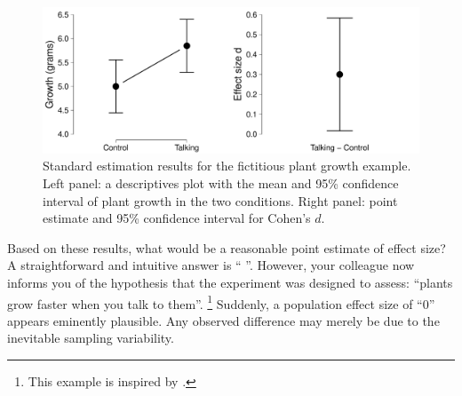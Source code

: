 \documentclass[a4paper]{article}
\newcommand{\getValue}[3]{%
	\pgfplotstablegetelem{#1}{#2}\of{#3}%
	\pgfmathprintnumber{\pgfplotsretval}%
}
\newcommand{\cohend}{\ensuremath{d}}
\begin{document}
\begin{figure}[!ht]
	\includegraphics[width=\textwidth]{descriptivesPlot.pdf}
	\caption{Standard estimation results for the fictitious plant growth example. Left panel: a descriptives plot with the mean and 95\% confidence interval of plant growth in the two conditions. Right panel: point estimate and 95\% confidence interval for Cohen's \cohend.}
	\label{fig:descriptivesPlot}
\end{figure}


Based on these results, what would be a reasonable point estimate of effect size? A straightforward and intuitive answer is ``\getValue{0}{Estimate}{\tbEffectSizeExample}''. However, your colleague now informs you of the hypothesis that the experiment was designed to assess: ``plants grow faster when you talk to them''.%
\footnote{%
This example is inspired by \protect\textcite{BergerDelampady1987}.
} Suddenly, a population effect size of ``0'' appears eminently plausible. Any observed difference may merely be due to the inevitable sampling variability.%
\end{document}
